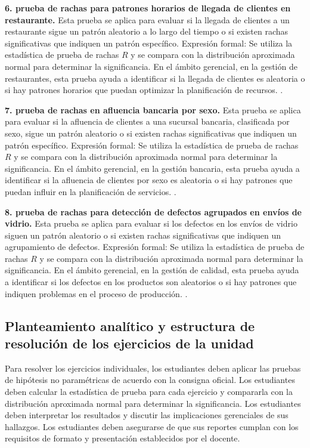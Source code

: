 {\textbf{6. prueba de rachas para patrones horarios de llegada de clientes en restaurante.} Esta prueba se aplica para evaluar si la llegada de clientes a un restaurante sigue un patrón aleatorio a lo largo del tiempo o si existen rachas significativas que indiquen un patrón específico. Expresión formal: Se utiliza la estadística de prueba de rachas $R$ y se compara con la distribución aproximada normal para determinar la significancia. En el ámbito gerencial, en la gestión de restaurantes, esta prueba ayuda a identificar si la llegada de clientes es aleatoria o si hay patrones horarios que puedan optimizar la planificación de recursos. \citep{anderson2012,lind2012,wackerly2010}.

\textbf{7. prueba de rachas en afluencia bancaria por sexo.} Esta prueba se aplica para evaluar si la afluencia de clientes a una sucursal bancaria, clasificada por sexo, sigue un patrón aleatorio o si existen rachas significativas que indiquen un patrón específico. Expresión formal: Se utiliza la estadística de prueba de rachas $R$ y se compara con la distribución aproximada normal para determinar la significancia. En el ámbito gerencial, en la gestión bancaria, esta prueba ayuda a identificar si la afluencia de clientes por sexo es aleatoria o si hay patrones que puedan influir en la planificación de servicios. \citep{anderson2012,lind2012,wackerly2010}.

\textbf{8. prueba de rachas para detección de defectos agrupados en envíos de vidrio.} Esta prueba se aplica para evaluar si los defectos en los envíos de vidrio siguen un patrón aleatorio o si existen rachas significativas que indiquen un agrupamiento de defectos. Expresión formal: Se utiliza la estadística de prueba de rachas $R$ y se compara con la distribución aproximada normal para determinar la significancia. En el ámbito gerencial, en la gestión de calidad, esta prueba ayuda a identificar si los defectos en los productos son aleatorios o si hay patrones que indiquen problemas en el proceso de producción. \citep{anderson2012,lind2012,wackerly2010}.


\subsection{Planteamiento analítico y estructura de resolución de los ejercicios de la unidad}
Para resolver los ejercicios individuales, los estudiantes deben aplicar las pruebas de hipótesis no paramétricas de acuerdo con la consigna oficial. Los estudiantes deben calcular la estadística de prueba para cada ejercicio y compararla con la distribución aproximada normal para determinar la significancia. Los estudiantes deben interpretar los resultados y discutir las implicaciones gerenciales de sus hallazgos. Los estudiantes deben asegurarse de que sus reportes cumplan con los requisitos de formato y presentación establecidos por el docente.

}

